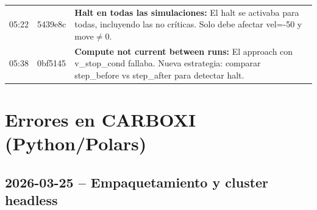 \documentclass[12pt,a4paper]{article}
\begin{document}
\begin{table}[H]
\begin{tabular}{@{}llp{9cm}@{}}
		05:22         & 5439e8c         & \textbf{Halt en todas las simulaciones:} El halt se activaba para todas, incluyendo las no críticas. Solo debe afectar vel=-50 y move$\neq$0.                \\
		05:38         & 0bf5145         & \textbf{Compute not current between runs:} El approach con v\_stop\_cond fallaba. Nueva estrategia: comparar step\_before vs step\_after para detectar halt. \\
		\bottomrule
	\end{tabular}
\end{table}

\section*{Errores en CARBOXI (Python/Polars)}

\subsection*{2026-03-25 -- Empaquetamiento y cluster headless}
\end{document}
